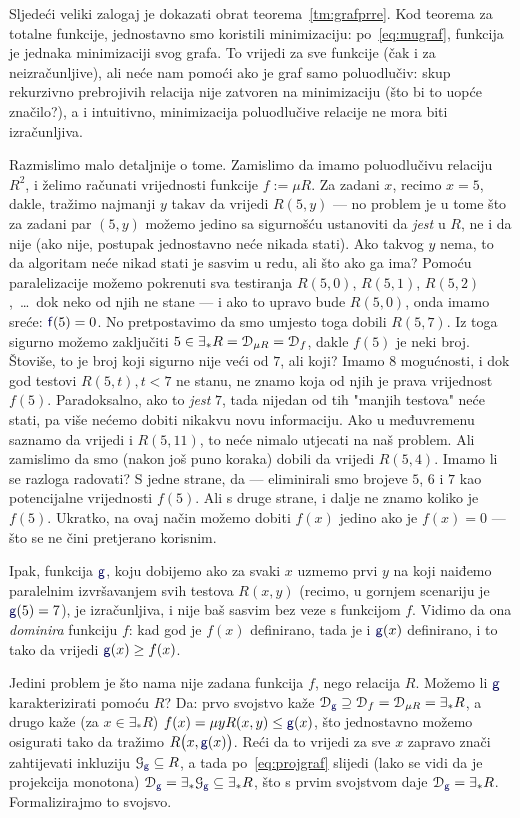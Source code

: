 Sljedeći veliki zalogaj je dokazati obrat teorema~\ref{tm:grafprre}. Kod teorema za totalne funkcije, jednostavno smo koristili minimizaciju: po~\eqref{eq:mugraf}, funkcija je jednaka minimizaciji svog grafa. To vrijedi za sve funkcije (čak i za neizračunljive), ali neće nam pomoći ako je graf samo poluodlučiv: skup rekurzivno prebrojivih relacija nije zatvoren na minimizaciju (što bi to uopće značilo?), a i intuitivno, minimizacija poluodlučive relacije ne mora biti izračunljiva.

Razmislimo malo detaljnije o tome. Zamislimo da imamo poluodlučivu relaciju $R^2$, i želimo računati vrijednosti funkcije $f:=\mu R$. Za zadani $x$, recimo $x=5$, dakle, tražimo najmanji $y$ takav da vrijedi $R(5,y)$ --- no problem je u tome što za zadani par $(5,y)$ možemo jedino sa sigurnošću ustanoviti da \emph{jest} u $R$, ne i da nije (ako nije, postupak jednostavno neće nikada stati). Ako takvog $y$ nema, to da algoritam neće nikad stati je sasvim u redu, ali što ako ga ima? Pomoću paralelizacije možemo pokrenuti sva testiranja $R(5,0)$, $R(5,1)$, $R(5,2)$,~\ldots\ dok neko od njih ne stane --- i ako to upravo bude $R(5,0)$, onda imamo sreće: $\f f(5)=0$. No pretpostavimo da smo umjesto toga dobili $R(5,7)$. Iz toga sigurno možemo zaključiti $5\in\exists_*R=\mathcal D_{\mu R}=\mathcal D_{f}$, dakle $f(5)$ je neki broj. Štoviše, to je broj koji sigurno nije veći od $7$, ali koji? Imamo $8$ mogućnosti, i dok god testovi $R(5,t),t<7$ ne stanu, ne znamo koja od njih je prava vrijednost $f(5)$. Paradoksalno, ako to \emph{jest} $7$, tada nijedan od tih "manjih testova" neće stati, pa više nećemo dobiti nikakvu novu informaciju. Ako u međuvremenu saznamo da vrijedi i $R(5,11)$, to neće nimalo utjecati na naš problem. Ali zamislimo da smo (nakon još puno koraka) dobili da vrijedi $R(5,4)$. Imamo li se razloga radovati? S jedne strane, da --- eliminirali smo brojeve $5$, $6$ i $7$ kao potencijalne vrijednosti $f(5)$. Ali s druge strane, i dalje ne znamo koliko je $f(5)$. Ukratko, na ovaj način možemo dobiti $f(x)$ jedino ako je $f(x)=0$ --- što se ne čini pretjerano korisnim.

Ipak, funkcija $\f g$, koju dobijemo ako za svaki $x$ uzmemo prvi $y$ na koji naiđemo paralelnim izvršavanjem svih testova $R(x,y)$ (recimo, u gornjem scenariju je $\f g(5)=7$), je izračunljiva, i nije baš sasvim bez veze s funkcijom $f$. Vidimo da ona \emph{dominira} funkciju $f$: kad god je $f(x)$ definirano, tada je i $\f g(x)$ definirano, i to tako da vrijedi $\f g(x)\ge f(x)$.

Jedini problem je što nama nije zadana funkcija $f$, nego relacija $R$. Možemo li $\f g$ karakterizirati pomoću $R$? Da: prvo svojstvo kaže $\dom{\f g}\supseteq\dom f=\dom{\mu R}=\exists_*R$, a drugo kaže (za $x\in\exists_*R$) $f(x)=\mu yR(x,y)\le\f g(x)$, što jednostavno možemo osigurati tako da tražimo $R\bigl(x,\f g(x)\bigr)$. Reći da to vrijedi za sve $x$ zapravo znači zahtijevati inkluziju $\graf{\f g}\subseteq R$, a tada po~\eqref{eq:projgraf} slijedi (lako se vidi da je projekcija monotona) $\dom{\f g}=\exists_*\graf{\f g}\subseteq\exists_*R$, što s prvim svojstvom daje $\dom{\f g}=\exists_*R$. Formalizirajmo to svojsvo.

